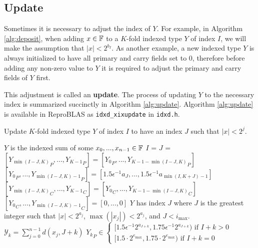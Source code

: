 \subsection{Update}
    \label{sec:primitiveops_update}
    Sometimes it is necessary to adjust the index of $Y$. For example, in Algorithm \ref{alg:deposit}, when adding $x \in \mathbb{F}$ to a $K$-fold
    indexed type $Y$ of index $I$, we will make the assumption that $|x| < 2^{b_I}$.
    As another example, a new indexed type $Y$ is always initialized to have all primary
    and carry fields set to 0, therefore before adding any non-zero value to $Y$
    it is required to adjust the primary and carry fields of $Y$ first.

    This adjustment is called an \textbf{update}.
    The process of updating $Y$ to the necessary index is summarized succinctly
    in Algorithm \ref{alg:update}. Algorithm \ref{alg:update} is available in ReproBLAS as \texttt{idxd_xixupdate} in \texttt{idxd.h}.

    \begin{samepage}
    \begin{alg}
      Update $K$-fold indexed type $Y$ of index $I$ to have an index $J$ such that $|x| < 2^j$.
      \begin{algorithmic}[1]
        \Require
          \Statex $Y$ is the indexed sum of some $x_0, ..., x_{n - 1} \in \mathbb{F}$
          \State $I$ = 
          \State $J$ = 
            \State $[{Y_{\min(I - J, K)}}_P, ..., {Y_{K - 1}}_P] = [{Y_0}_P, ..., {Y_{K - 1 - \min(I - J, K)}}_P]$
            \State $[{Y_0}_P, ..., {Y_{\min(I - J, K) - 1}}_P] = [1.5  \epsilon^{-1}  a_{J}, ..., 1.5  \epsilon^{-1}  a_{\min(I, K + J) - 1}]$
            \State $[{Y_{\min(I - J, K)}}_C, ..., {Y_{K - 1}}_C] = [{Y_0}_C, ..., {Y_{K - 1 - \min(I - J, K)}}_C]$
            \State $[{Y_0}_C, ..., {Y_{\min(I - J, K) - 1}}_C] = [0, ..., 0]$
          \EndIf
        \EndFunction
        \Ensure
          \Statex $Y$ has index $J$ where $J$ is the greatest integer such that $|x| < 2^{a_j}$, $\max(|x_j|) < 2^{a_j}$, and $J < i_{\max}$.
          \Statex $\mathcal{Y}_k = \sum\limits_{j = 0}^{n - 1} d(x_j, J + k)$
          \Statex ${Y_k}_P \in \begin{cases}[1.5  \epsilon^{-1} 2^{a_{J + k}}, 1.75  \epsilon^{-1} 2^{a_{J + k}}) \text{ if } I + k > 0 \\ [1.5 \cdot 2^{e_{\max}}, 1.75 \cdot 2^{e_{\max}}) \text{ if } I + k = 0\end{cases}$
      \end{algorithmic}
      \label{alg:update}
    \end{alg}
    \end{samepage}


